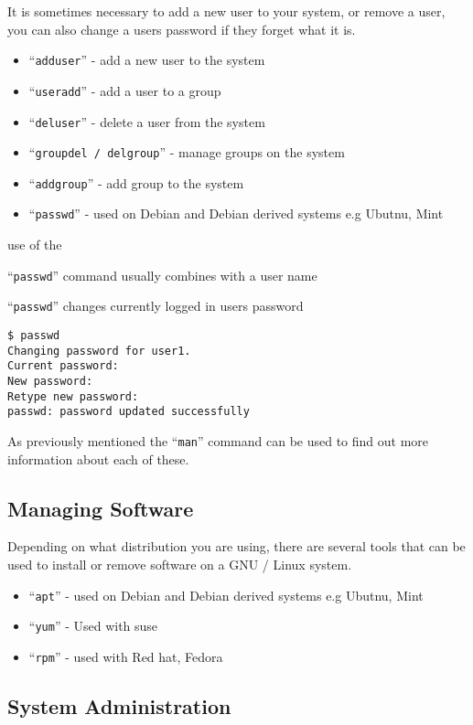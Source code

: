\documentclass{extbook}
\begin{document}
It is sometimes necessary to add a new user to your system, or remove a user, you can also change a users password if they forget what it is.

\begin{itemize}
\item ``\verb|adduser|'' - add a new user to the system
\item ``\verb|useradd|'' - add a user to a group
\item ``\verb|deluser|'' - delete a user from the system
\item ``\verb|groupdel / delgroup|'' - manage groups on the system
\item ``\verb|addgroup|'' - add group to the system
\item ``\verb|passwd|'' - used on Debian and Debian derived systems e.g Ubutnu, Mint
\end{itemize}

use of the \item ``\verb|passwd|'' command usually combines with a user name

\item ``\verb|passwd|'' changes currently logged in users password

\begin{verbatim}
$ passwd
Changing password for user1.
Current password: 
New password: 
Retype new password: 
passwd: password updated successfully
\end{verbatim}

As previously mentioned the ``\verb|man|'' command can be used to find out more information about each of these. 

\subsection{Managing Software}

Depending on what distribution you are using, there are several tools that can be used to install or remove software on a GNU / Linux system.  

\begin{itemize}
\item ``\verb|apt|'' - used on Debian and Debian derived systems e.g Ubutnu, Mint
\item ``\verb|yum|'' - Used with suse 
\item ``\verb|rpm|'' - used with Red hat, Fedora 
\end{itemize}

\subsection{System Administration}
\end{document}
